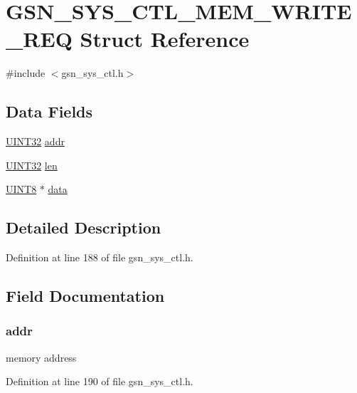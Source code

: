 \hypertarget{a00251}{
\section{GSN\_\-SYS\_\-CTL\_\-MEM\_\-WRITE\_\-REQ Struct Reference}
\label{a00251}
}


{\ttfamily \#include $<$gsn\_\-sys\_\-ctl.h$>$}

\subsection*{Data Fields}
\begin{DoxyCompactItemize}
\item 
\hyperlink{a00660_gae1e6edbbc26d6fbc71a90190d0266018}{UINT32} \hyperlink{a00251_a211571ed47a0fee2d898236395234dab}{addr}
\item 
\hyperlink{a00660_gae1e6edbbc26d6fbc71a90190d0266018}{UINT32} \hyperlink{a00251_ab9abc6ede61238a05664f9c37e4412c3}{len}
\item 
\hyperlink{a00660_gab27e9918b538ce9d8ca692479b375b6a}{UINT8} $\ast$ \hyperlink{a00251_ab0caf92e8b07e8b3a5f718e696b1f6a8}{data}
\end{DoxyCompactItemize}


\subsection{Detailed Description}


Definition at line 188 of file gsn\_\-sys\_\-ctl.h.



\subsection{Field Documentation}
\hypertarget{a00251_a211571ed47a0fee2d898236395234dab}{
\subsubsection[{addr}]{ {\bf addr}}}
\label{a00251_a211571ed47a0fee2d898236395234dab}
memory address 

Definition at line 190 of file gsn\_\-sys\_\-ctl.h.

